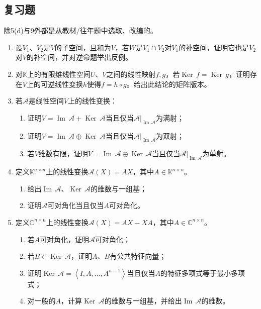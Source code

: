 \documentclass[a4paper,UTF8,fontset=windows,AutoFakeBold]{ctexart}
\DeclareMathOperator{\im}{Im\,}
\DeclareMathOperator{\Ker}{Ker\,}
\newcommand*{\ma}{\mathcal{A}}
\begin{document}
\subsection{复习题}
除5(d)与9外都是从教材/往年题中选取、改编的。
\begin{enumerate}
    \item 设$V_1$、$V_2$是$V$的子空间，且和为$V$，若$W$是$V_1\cap V_2$对$V_1$的补空间，证明它也是$V_2$对$V$的补空间，并对逆命题举出反例。
    
    \item 对$\mathbb{K}$上的有限维线性空间$U$、$V$之间的线性映射$f,g$，若$\Ker f=\Ker g$，证明存在$V$上的可逆线性变换$h$使得$f=h\circ g$。给出此结论的矩阵版本。
    
    \item 若$\ma$是线性空间$V$上的线性变换：
    \begin{enumerate}
        \item 证明$V=\im\ma+\Ker\ma$当且仅当$\ma|_{\im\ma}$为满射；
        \item 证明$V=\im\ma\oplus\Ker\ma$当且仅当$\ma|_{\im\ma}$为双射；
        \item 若$V$维数有限，证明$V=\im\ma\oplus\Ker\ma$当且仅当$\ma|_{\im\ma}$为单射。
    \end{enumerate}

    \item 定义$\mathbb{K}^{n\times n}$上的线性变换$\ma(X)=AX$，其中$A\in\mathbb{K}^{n\times n}$。
    \begin{enumerate}
        \item 给出$\im\ma$、$\Ker\ma$的维数与一组基；
        \item 证明$\ma$可对角化当且仅当$A$可对角化。
    \end{enumerate}

    \item 定义$\mathbb{C}^{n\times n}$上的线性变换$\ma(X)=AX-XA$，其中$A\in\mathbb{C}^{n\times n}$。
    \begin{enumerate}
        \item 若$A$可对角化，证明$\ma$可对角化；
        \item 若$B\in\Ker\ma$，证明$A$、$B$有公共特征向量；
        \item 证明$\Ker\ma=\left<I,A,\dots,A^{n-1}\right>$当且仅当$A$的特征多项式等于最小多项式；
        \item 对一般的$A$，计算$\Ker\ma$的维数与一组基，并给出$\im\ma$的维数。
    \end{enumerate}


\end{enumerate}
\end{document}
